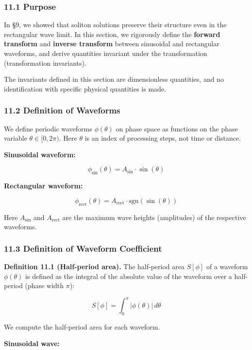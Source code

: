 \documentclass[a4paper,11pt]{article}
\begin{document}
\subsubsection{11.1 Purpose}\label{purpose-1}

In §9, we showed that soliton solutions preserve their structure even in
the rectangular wave limit. In this section, we rigorously define the
\textbf{forward transform} and \textbf{inverse transform} between
sinusoidal and rectangular waveforms, and derive quantities invariant
under the transformation (transformation invariants).

The invariants defined in this section are dimensionless quantities, and
no identification with specific physical quantities is made.

\subsubsection{11.2 Definition of
Waveforms}\label{definition-of-waveforms}

We define periodic waveforms \(\phi(\theta)\) on phase space as
functions on the phase variable \(\theta \in [0, 2\pi)\). Here
\(\theta\) is an index of processing steps, not time or distance.

\textbf{Sinusoidal waveform:}

\[\phi_{\sin}(\theta) = A_{\sin} \cdot \sin(\theta) \tag{W1}\]

\textbf{Rectangular waveform:}

\[\phi_{\text{rect}}(\theta) = A_{\text{rect}} \cdot \mathrm{sgn}(\sin(\theta)) \tag{W2}\]

Here \(A_{\sin}\) and \(A_{\text{rect}}\) are the maximum wave heights
(amplitudes) of the respective waveforms.

\subsubsection{11.3 Definition of Waveform
Coefficient}\label{definition-of-waveform-coefficient}

\textbf{Definition 11.1 (Half-period area).} The half-period area
\(S[\phi]\) of a waveform \(\phi(\theta)\) is defined as the integral of
the absolute value of the waveform over a half-period (phase width
\(\pi\)):

\[S[\phi] = \int_0^{\pi} |\phi(\theta)|\, d\theta \tag{W3}\]

We compute the half-period area for each waveform.

\textbf{Sinusoidal wave:}
\end{document}
